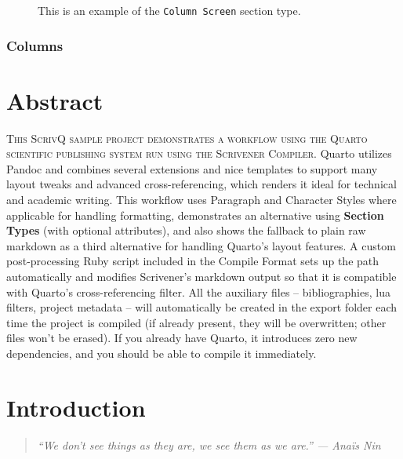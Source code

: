 \documentclass[
  12pt,
  a4paper,
  oneside,
  titlepage,
  toclink=all,
  toc=bibliography]{scrbook}
\theoremstyle{definition}
\theoremstyle{plain}
\theoremstyle{plain}
\theoremstyle{plain}
\theoremstyle{plain}
\theoremstyle{definition}
\theoremstyle{definition}
\theoremstyle{plain}
\theoremstyle{remark}
\begin{document}
\hypertarget{scriv146}{}
\begin{figure}

This is an example of the \texttt{Column\ Screen} section type.

\end{figure}

\hypertarget{sec-scriv147}{%
\subsection{Columns}\label{sec-scriv147}}

\protect\hypertarget{scriv147}{}{}

\hypertarget{sec-scriv148}{%
\chapter{Abstract}\label{sec-scriv148}}

\protect\hypertarget{scriv148}{}{}

\textsc{This ScrivQ sample project demonstrates a workflow using the
Quarto scientific publishing system run using the Scrivener Compiler}.
Quarto utilizes Pandoc and combines several extensions and nice
templates to support many layout tweaks and advanced cross-referencing,
which renders it ideal for technical and academic writing. This workflow
uses Paragraph and Character Styles where applicable for handling
formatting, demonstrates an alternative using \textbf{Section Types}
(with optional attributes), and also shows the fallback to plain raw
markdown as a third alternative for handling Quarto's layout features. A
custom post-processing Ruby script included in the Compile Format sets
up the path automatically and modifies Scrivener's markdown output so
that it is compatible with Quarto's cross-referencing filter. All the
auxiliary files -- bibliographies, lua filters, project metadata -- will
automatically be created in the export folder each time the project is
compiled (if already present, they will be overwritten; other files
won't be erased). If you already have Quarto, it introduces zero new
dependencies, and you should be able to compile it immediately.

\hypertarget{sec-scriv149}{%
\chapter{Introduction}\label{sec-scriv149}}

\protect\hypertarget{scriv149}{}{}

\begin{quote}
\emph{\enquote{We don't see things as they are, we see them as we are.}
--- Anaïs Nin}
\end{quote}
\end{document}
